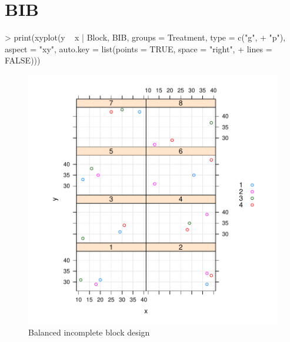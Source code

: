 \documentclass[12pt]{article}
\begin{document}
\section{BIB}
\label{sec:BIB}
\begin{Schunk}
\begin{Sinput}
> print(xyplot(y ~ x | Block, BIB, groups = Treatment, type = c("g", 
+     "p"), aspect = "xy", auto.key = list(points = TRUE, space = "right", 
+     lines = FALSE)))
\end{Sinput}
\end{Schunk}
\begin{figure}[tbp]
  \centering
  \includegraphics{figs/f-bib1}
  \caption{Balanced incomplete block design}
  \label{fig:bib1}
\end{figure}
\end{document}
